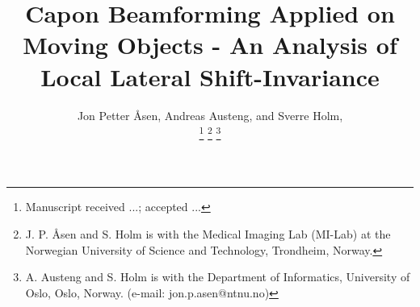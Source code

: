 \documentclass[journal]{IEEEtran}
\begin{document}
%
\title{Capon Beamforming Applied on Moving Objects - An Analysis of Local Lateral Shift-Invariance}
%
%
%

\author{
   Jon Petter \AA{}sen,  Andreas Austeng,  and Sverre Holm, %
   
\thanks{Manuscript received ...; accepted ...}
\thanks{J. P. \AA{}sen and S. Holm is with the Medical Imaging Lab (MI-Lab) at the Norwegian University of Science and Technology, Trondheim, Norway.}
\thanks{A. Austeng and S. Holm is with the Department of Informatics, University of Oslo, Oslo, Norway. (e-mail: jon.p.asen@ntnu.no)} 
}

% 
%
\end{document}
